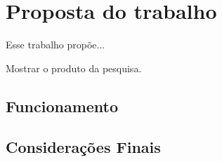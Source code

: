\chapter{Proposta do trabalho}\label{cap:proposta}

Esse trabalho propõe... 

Mostrar o produto da pesquisa.

\section{Funcionamento}

\lipsum[67-73]

\section{Considerações Finais}

\lipsum[68]
